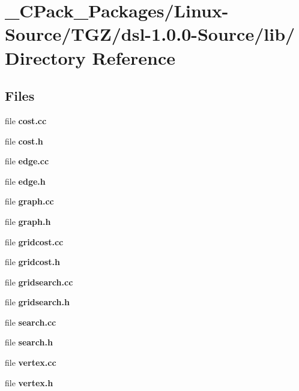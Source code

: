 \section{\_\-CPack\_\-Packages/Linux-\/Source/TGZ/dsl-\/1.0.0-\/Source/lib/ Directory Reference}
\label{dir_d1079e05208c63aa58c2ffe7641e9b84}
\subsection*{Files}
\begin{DoxyCompactItemize}
\item 
file {\bf cost.cc}
\item 
file {\bf cost.h}
\item 
file {\bf edge.cc}
\item 
file {\bf edge.h}
\item 
file {\bf graph.cc}
\item 
file {\bf graph.h}
\item 
file {\bf gridcost.cc}
\item 
file {\bf gridcost.h}
\item 
file {\bf gridsearch.cc}
\item 
file {\bf gridsearch.h}
\item 
file {\bf search.cc}
\item 
file {\bf search.h}
\item 
file {\bf vertex.cc}
\item 
file {\bf vertex.h}
\end{DoxyCompactItemize}
